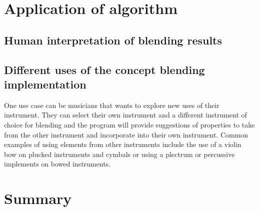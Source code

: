 



\section{Application of algorithm}

\subsection{Human interpretation of blending results}


\subsection{Different uses of the concept blending implementation}
One use case can be musicians that wants to explore new uses of their instrument. They can select their own instrument and a different instrument of choice for blending and the program will provide suggestions of properties to take from the other instrument and incorporate into their own instrument. Common examples of using elements from other instruments include the use of a violin bow on plucked instruments and cymbals or using a plectrum or percussive implements on bowed instruments.




\section{Summary}

